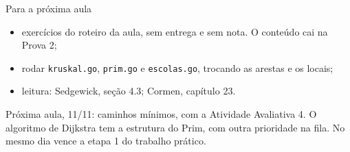 \documentclass{beamer}
\begin{document}
\begin{frame}{Para a próxima aula}
	\begin{itemize}
		\item exercícios do roteiro da aula, sem entrega e sem nota. O conteúdo
		      cai na Prova 2;
		\item rodar \texttt{kruskal.go}, \texttt{prim.go} e
		      \texttt{escolas.go}, trocando as arestas e os locais;
		\item leitura: Sedgewick, seção 4.3; Cormen, capítulo 23.
	\end{itemize}

	\vspace{0.4cm}
	Próxima aula, 11/11: caminhos mínimos, com a Atividade Avaliativa 4. O
	algoritmo de Dijkstra tem a estrutura do Prim, com outra prioridade na fila.
	No mesmo dia vence a etapa 1 do trabalho prático.
\end{frame}
\end{document}
